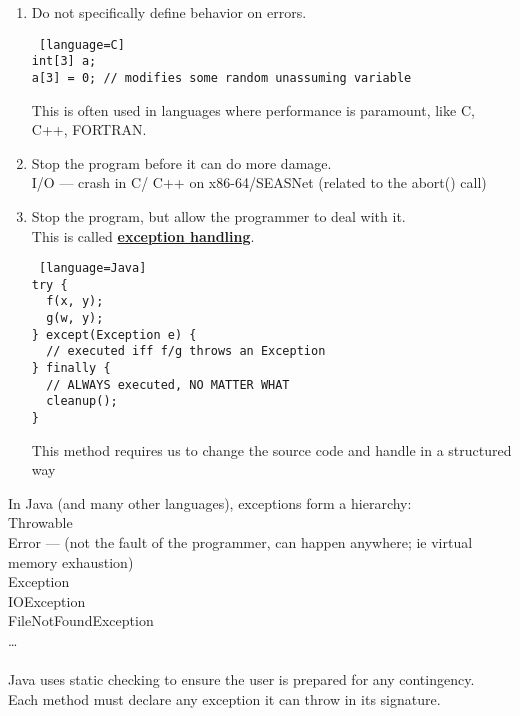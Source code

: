 \documentclass[../../lecture_notes.tex]{subfiles}
\begin{document}
\begin{enumerate}
		Most machines use it as in the method of ‘floats’:
		\begin{lstlisting} [language=Java]
double a = 127;
double b = 0;
double c = a/b; // returns infinite (in Java)
double d = c + 7; // sets d to infinity
		\end{lstlisting}
		This is great because it is safe and thus very popular!
	\item Do not specifically define behavior on errors.\\
		\begin{lstlisting} [language=C]
int[3] a;
a[3] = 0; // modifies some random unassuming variable
		\end{lstlisting}
		This is often used in languages where performance is paramount, like C, C++, FORTRAN.
	\item Stop the program before it can do more damage.\\
		I/O — crash in C/ C++ on x86-64/SEASNet (related to the abort() call)
	\item Stop the program, but allow the programmer to deal with it.\\
		This is called \textbf{\underline{exception handling}}. \begin{lstlisting} [language=Java]
try {
  f(x, y);
  g(w, y);
} except(Exception e) {
  // executed iff f/g throws an Exception
} finally {
  // ALWAYS executed, NO MATTER WHAT
  cleanup();
}
		\end{lstlisting}
		This method requires us to change the source code and handle in a structured way
\end{enumerate}

\noindent In Java (and many other languages), exceptions form a hierarchy:\\
\indent Throwable\\
\indent \indent Error — (not the fault of the programmer, can happen anywhere; ie virtual memory exhaustion)\\
\indent \indent Exception\\
\indent \indent \indent IOException\\
\indent \indent \indent FileNotFoundException\\
\indent \indent \indent …\\
\\
Java uses static checking to ensure the user is prepared for any contingency.\\
Each method must declare any exception it can throw in its signature.\\
\end{document}
